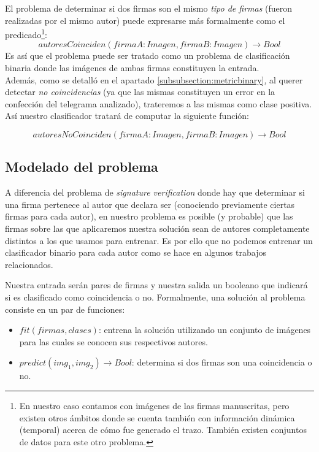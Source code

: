El problema de determinar si dos firmas son el mismo \textit{tipo de firmas} (fueron realizadas por el mismo autor) puede expresarse más formalmente como el predicado\footnote{En nuestro caso contamos con imágenes de las firmas manuscritas, pero existen otros ámbitos donde se cuenta también con información dinámica (temporal) acerca de cómo fue generado el trazo. También existen conjuntos de datos para este otro problema.}:
\begin{equation*}
    autoresCoinciden( firmaA : Imagen, firmaB : Imagen) \rightarrow Bool
\end{equation*}
Es así que el problema puede ser tratado como un problema de clasificación binaria donde las imágenes de ambas firmas constituyen la entrada.\\

Además, como se detalló en el apartado \ref{subsubsection:metricbinary}, al querer detectar \textit{no coincidencias} (ya que las mismas constituyen un error en la confección del telegrama analizado), trateremos a las mismas como clase positiva. Así nuestro clasificador tratará de computar la siguiente función:

\begin{equation*}
    autoresNoCoinciden( firmaA : Imagen, firmaB : Imagen) \rightarrow Bool
\end{equation*}

\subsection{Modelado del problema}

A diferencia del problema de \textit{signature verification} donde hay que determinar si una firma pertenece al autor que declara ser (conociendo previamente ciertas firmas para cada autor), en nuestro problema es posible (y probable) que las firmas sobre las que aplicaremos nuestra solución sean de autores completamente distintos a los que usamos para entrenar. Es por ello que no podemos entrenar un clasificador binario para cada autor como se hace en algunos trabajos relacionados.

Nuestra entrada serán pares de firmas y nuestra salida un booleano que indicará si es clasificado como coincidencia o no. Formalmente, una solución al problema consiste en un par de funciones:
\begin{itemize}
    \item $fit(firmas, clases)$: entrena la solución utilizando un conjunto de imágenes para las cuales se conocen sus respectivos autores.
    \item $predict(img_1, img_2) \rightarrow Bool$: determina si dos firmas son una coincidencia o no.
\end{itemize}

